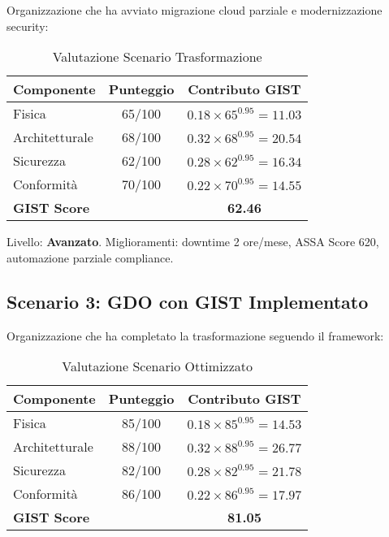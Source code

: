 Organizzazione che ha avviato migrazione cloud parziale e modernizzazione security:

\begin{table}[htbp]
\centering
\caption{Valutazione Scenario Trasformazione}
\label{tab:scenario2}
\begin{tabular}{lcc}
\toprule
\textbf{Componente} & \textbf{Punteggio} & \textbf{Contributo GIST} \\
\midrule
Fisica & 65/100 & $0.18 \times 65^{0.95} = 11.03$ \\
Architetturale & 68/100 & $0.32 \times 68^{0.95} = 20.54$ \\
Sicurezza & 62/100 & $0.28 \times 62^{0.95} = 16.34$ \\
Conformità & 70/100 & $0.22 \times 70^{0.95} = 14.55$ \\
\midrule
\textbf{GIST Score} & & \textbf{62.46} \\
\bottomrule
\end{tabular}
\end{table}

Livello: \textbf{Avanzato}. Miglioramenti: downtime 2 ore/mese, ASSA Score 620, automazione parziale compliance.

\subsection{Scenario 3: GDO con GIST Implementato}
\label{subsec:scenario3}

Organizzazione che ha completato la trasformazione seguendo il framework:

\begin{table}[htbp]
\centering
\caption{Valutazione Scenario Ottimizzato}
\label{tab:scenario3}
\begin{tabular}{lcc}
\toprule
\textbf{Componente} & \textbf{Punteggio} & \textbf{Contributo GIST} \\
\midrule
Fisica & 85/100 & $0.18 \times 85^{0.95} = 14.53$ \\
Architetturale & 88/100 & $0.32 \times 88^{0.95} = 26.77$ \\
Sicurezza & 82/100 & $0.28 \times 82^{0.95} = 21.78$ \\
Conformità & 86/100 & $0.22 \times 86^{0.95} = 17.97$ \\
\midrule
\textbf{GIST Score} & & \textbf{81.05} \\
\bottomrule
\end{tabular}
\end{table}

